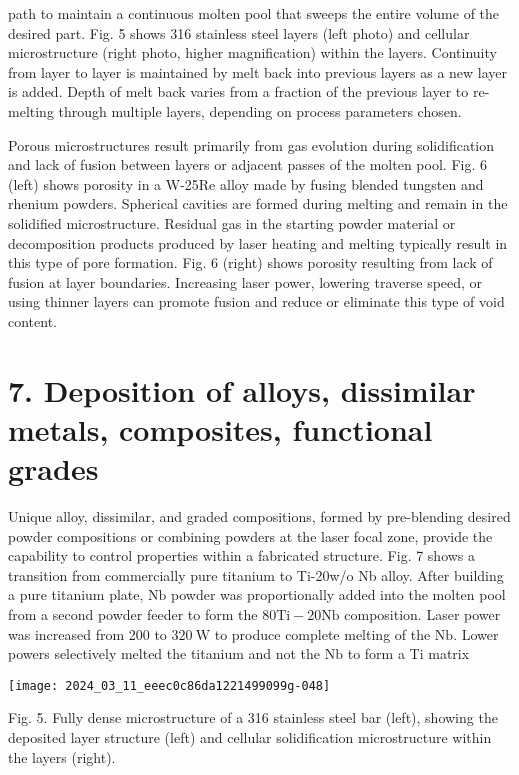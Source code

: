 \documentclass[10pt]{article}
\begin{document}
path to maintain a continuous molten pool that sweeps the entire volume of the desired part. Fig. 5 shows 316 stainless steel layers (left photo) and cellular microstructure (right photo, higher magnification) within the layers. Continuity from layer to layer is maintained by melt back into previous layers as a new layer is added. Depth of melt back varies from a fraction of the previous layer to re-melting through multiple layers, depending on process parameters chosen.

Porous microstructures result primarily from gas evolution during solidification and lack of fusion between layers or adjacent passes of the molten pool. Fig. 6 (left) shows porosity in a W-25Re alloy made by fusing blended tungsten and rhenium powders. Spherical cavities are formed during melting and remain in the solidified microstructure. Residual gas in the starting powder material or decomposition products produced by laser heating and melting typically result in this type of pore formation. Fig. 6 (right) shows porosity resulting from lack of fusion at layer boundaries. Increasing laser power, lowering traverse speed, or using thinner layers can promote fusion and reduce or eliminate this type of void content.

\section*{7. Deposition of alloys, dissimilar metals, composites, functional grades}
Unique alloy, dissimilar, and graded compositions, formed by pre-blending desired powder compositions or combining powders at the laser focal zone, provide the capability to control properties within a fabricated structure. Fig. 7 shows a transition from commercially pure titanium to Ti-20w/o Nb alloy. After building a pure titanium plate, $\mathrm{Nb}$ powder was proportionally added into the molten pool from a second powder feeder to form the $80 \mathrm{Ti}-20 \mathrm{Nb}$ composition. Laser power was increased from 200 to $320 \mathrm{~W}$ to produce complete melting of the $\mathrm{Nb}$. Lower powers selectively melted the titanium and not the $\mathrm{Nb}$ to form a Ti matrix

\begin{center}
\texttt{[image: 2024\_03\_11\_eeec0c86da1221499099g-048]}
\end{center}

Fig. 5. Fully dense microstructure of a 316 stainless steel bar (left), showing the deposited layer structure (left) and cellular solidification microstructure within the layers (right).
\end{document}
